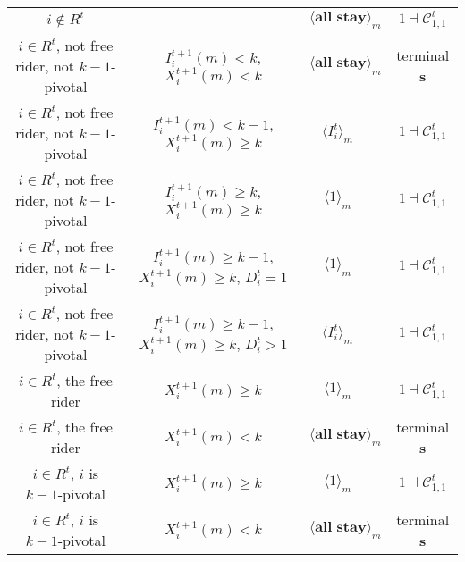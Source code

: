 \documentclass[12pt,letter]{article}
\newcommand{\Kappa}{\mathcal{C}}
\theoremstyle{definition}
\theoremstyle{remark}
\theoremstyle{claim}
\begin{document}
\begin{landscape}
\begin{table}[!htbp]
\begin{center}
\begin{tabular}{c c | c | c | c}
\hline
\hline
$i\notin R^t$  	& 								& $\langle \textbf{all stay} \rangle_m$		&  			& $1\dashv \Kappa^t_{1,1}$ \\
$i\in R^t$, not free rider, not $k-1$-pivotal		 	&  $I^{t+1}_i(m)< k$, $X^{t+1}_i(m)<k$			&  $\langle \textbf{all stay} \rangle_m$	& 	& terminal \textbf{s} \\
$i\in R^t$, not free rider, not $k-1$-pivotal	  	& $I^{t+1}_i(m)<k-1$, $X^{t+1}_i(m)\geq k$		    & $\langle I^t_i \rangle_m$ 		&    			& $1\dashv \Kappa^t_{1,1}$ \\
$i\in R^t$, not free rider, not $k-1$-pivotal	 	&  $I^{t+1}_i(m)\geq k$, $X^{t+1}_i(m)\geq k$	& $\langle 1 \rangle_m$ 	& 	& $1\dashv \Kappa^t_{1,1}$ \\
$i\in R^t$, not free rider, not $k-1$-pivotal	 	&  $I^{t+1}_i(m)\geq k-1$, $X^{t+1}_i(m)\geq k$, $D^t_i=1$	& $\langle 1 \rangle_m$ 	& 	& $1\dashv \Kappa^t_{1,1}$ \\
$i\in R^t$, not free rider, not $k-1$-pivotal	 	&  $I^{t+1}_i(m)\geq k-1$, $X^{t+1}_i(m)\geq k$, $D^t_i>1$	& $\langle I^t_i \rangle_m$ 	& 	& $1\dashv \Kappa^t_{1,1}$ \\
$i\in R^t$, the free rider  	&  $X^{t+1}_i(m)\geq k$ & $\langle 1 \rangle_m$ 		& 				  & $1\dashv \Kappa^t_{1,1}$ \\
$i\in R^t$, the free rider  	&  		$X^{t+1}_i(m)<k$					&  $\langle \textbf{all stay} \rangle_m$		& 										  & terminal \textbf{s} \\
$i\in R^t$, $i$ is $k-1$-pivotal  	&  $X^{t+1}_i(m)\geq k$ & $\langle 1 \rangle_m$ 	& 											 & $1\dashv \Kappa^t_{1,1}$ \\
$i\in R^t$, $i$ is $k-1$-pivotal  	&  	$X^{t+1}_i(m)<k$		&  $\langle \textbf{all stay} \rangle_m$	& 											 & terminal \textbf{s} \\
\hline
\end{tabular}
\end{center}
\end{table}


\end{landscape}




\clearpage
\end{document}
